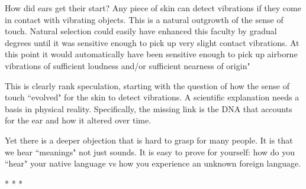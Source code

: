 \begin{quotex}
How did ears get their start? Any piece of skin can detect vibrations if they come in contact with vibrating objects. This is a natural outgrowth of the sense of touch. Natural selection could easily have enhanced this faculty by gradual degrees until it was sensitive enough to pick up very slight contact vibrations. At this point it would automatically have been sensitive enough to pick up airborne vibrations of sufficient loudness and/or sufficient nearness of origin" 

\end{quotex}
This is clearly rank speculation, starting with the question of how the sense of touch ``evolved" for the skin to detect vibrations. A scientific explanation needs a basis in physical reality. Specifically, the missing link is the DNA that accounts for the ear and how it altered over time.

Yet there is a deeper objection that is hard to grasp for many people. It is that we hear ``meanings" not just sounds. It is easy to prove for yourself: how do you ``hear" your native language vs how you experience an unknown foreign language.




\begin{center}* * *\end{center}

